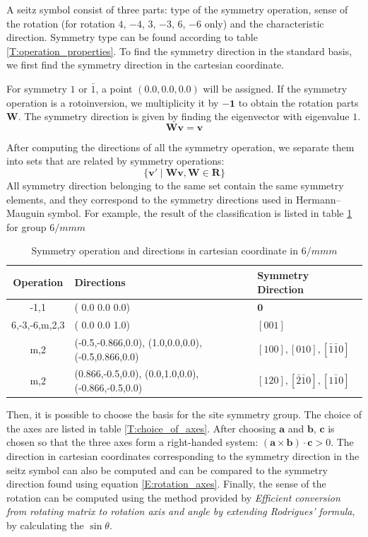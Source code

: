 \documentclass{article}
\begin{document}
A seitz symbol consist of three parts: type of the symmetry operation, sense of the rotation 
(for rotation $4$, $-4$, $3$, $-3$, $6$, $-6$ only) and the characteristic direction. 
Symmetry type can be found according to table \ref{T:operation_properties}. To find the 
symmetry direction in the standard basis, we first find the symmetry direction in the cartesian coordinate. 

For symmetry $1$ or $\bar{1}$, a point $(0.0, 0.0, 0.0)$ will be assigned. If the symmetry operation is a rotoinversion,
we multiplicity it by $-\mathbf{1}$ to obtain the rotation parts $\mathbf{W}$. 
The symmetry direction is given by finding the eigenvector with eigenvalue $1$. 
\begin{equation}
    \label{E:rotation_axes}
    \mathbf{W}\mathbf{v} = \mathbf{v}
\end{equation}

After computing the directions of all the symmetry operation, we separate them into sets that are related by symmetry operations:
\begin{equation}
    \{\mathbf{v}' \mid \mathbf{W}\mathbf{v}, \mathbf{W} \in \mathbf{R}\}
\end{equation}
All symmetry direction belonging to the same set contain the same symmetry elements, and they correspond to the symmetry directions 
used in Hermann--Mauguin symbol. For example, the result of the classification is listed in table \ref{T:6mmm} for group $6/mmm$
\begin{table}[h]
    \centering
    \caption{Symmetry operation and directions in cartesian coordinate in $6/mmm$}
    \begin{tabular}{|c|l|l|}
        \hline
        Operation & Directions & Symmetry Direction\\
        \hline
        -1,1 & (  0.0  0.0  0.0) & $\mathbf{0}$\\
        6,-3,-6,m,2,3 & (  0.0  0.0  1.0) & $[001]$\\
        m,2 & (-0.5,-0.866,0.0), (1.0,0.0,0.0), (-0.5,0.866,0.0) & $[100],[010],[\bar{1}\bar{1}0]$\\
        m,2 & (0.866,-0.5,0.0), (0.0,1.0,0.0), (-0.866,-0.5,0.0) & $[120],[\bar{2}\bar{1}0],[1\bar{1}0]$\\
        \hline
    \end{tabular}
    \label{T:6mmm}
\end{table}

Then, it is possible to choose the basis for the site symmetry group. The choice of 
the axes are listed in table \ref{T:choice_of_axes}. 
After choosing $\mathbf{a}$ and $\mathbf{b}$, $\mathbf{c}$ is chosen so that the three axes
form a right-handed system: $(\mathbf{a}\times \mathbf{b}) \cdot \mathbf{c} > 0$. 
The direction in cartesian coordinates corresponding to the symmetry direction in the seitz symbol can also be computed and can be 
compared to the symmetry direction found using equation \eqref{E:rotation_axes}. Finally, the 
sense of the rotation can be computed using the method provided by 
\emph{Efficient conversion from rotating matrix to rotation axis and angle by extending Rodrigues’ formula},
by calculating the $\sin\theta$. 
\end{document}

